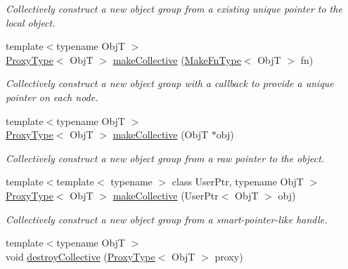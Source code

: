 \begin{DoxyCompactItemize}
\begin{DoxyCompactList}\small\item\em Collectively construct a new object group from a existing unique pointer to the local object. \end{DoxyCompactList}\item 
{\footnotesize template$<$typename ObjT $>$ }\\\hyperlink{structvt_1_1objgroup_1_1_obj_group_manager_aea65eef52f240a52210132eef5ce591f}{Proxy\+Type}$<$ ObjT $>$ \hyperlink{structvt_1_1objgroup_1_1_obj_group_manager_a34d75d825c84636cd9c13f6185243414}{make\+Collective} (\hyperlink{structvt_1_1objgroup_1_1_obj_group_manager_a397d787b3876752a6d70511b2769b872}{Make\+Fn\+Type}$<$ ObjT $>$ fn)
\begin{DoxyCompactList}\small\item\em Collectively construct a new object group with a callback to provide a unique pointer on each node. \end{DoxyCompactList}\item 
{\footnotesize template$<$typename ObjT $>$ }\\\hyperlink{structvt_1_1objgroup_1_1_obj_group_manager_aea65eef52f240a52210132eef5ce591f}{Proxy\+Type}$<$ ObjT $>$ \hyperlink{structvt_1_1objgroup_1_1_obj_group_manager_a08fdc6029708edf1e3f7a4a66c998b99}{make\+Collective} (ObjT $\ast$obj)
\begin{DoxyCompactList}\small\item\em Collectively construct a new object group from a raw pointer to the object. \end{DoxyCompactList}\item 
{\footnotesize template$<$template$<$ typename $>$ class User\+Ptr, typename ObjT $>$ }\\\hyperlink{structvt_1_1objgroup_1_1_obj_group_manager_aea65eef52f240a52210132eef5ce591f}{Proxy\+Type}$<$ ObjT $>$ \hyperlink{structvt_1_1objgroup_1_1_obj_group_manager_affb52495aa20a14b485ad3ba48234718}{make\+Collective} (User\+Ptr$<$ ObjT $>$ obj)
\begin{DoxyCompactList}\small\item\em Collectively construct a new object group from a smart-\/pointer-\/like handle. \end{DoxyCompactList}\item 
{\footnotesize template$<$typename ObjT $>$ }\\void \hyperlink{structvt_1_1objgroup_1_1_obj_group_manager_ad02bff10088a4f8e453cf24bd832308c}{destroy\+Collective} (\hyperlink{structvt_1_1objgroup_1_1_obj_group_manager_aea65eef52f240a52210132eef5ce591f}{Proxy\+Type}$<$ ObjT $>$ proxy)

\end{DoxyCompactItemize}
